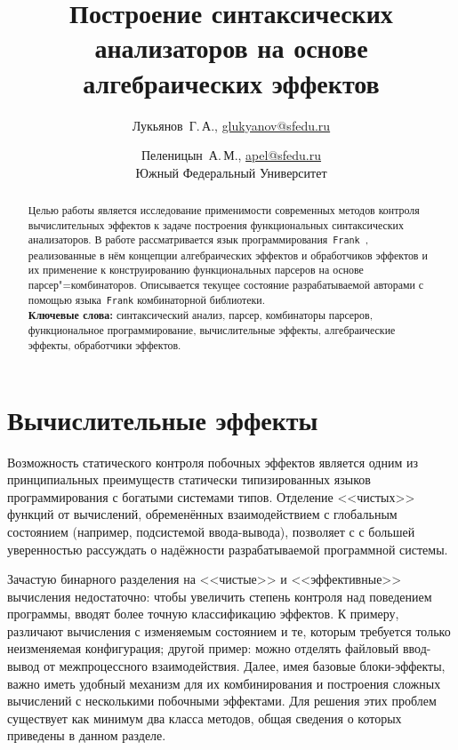 \documentclass [a4paper] {article}
\title %
  {Построение синтаксических анализаторов
   на основе алгебраических эффектов}
\author %
{%
  Лукьянов~Г.\,А., \url {glukyanov@sfedu.ru} \and %
  Пеленицын~А.\,М., \url {apel@sfedu.ru} \\
  Южный Федеральный Университет
}%
\date {}    %
\begin{document}

\maketitle

\begin {abstract}
  Целью работы является исследование применимости современных методов
  контроля вычислительных эффектов к задаче построения функциональных синтаксических анализаторов. В работе рассматривается язык
  программирования~\texttt{Frank}~\cite{Frank}, реализованные в нём концепции
  алгебраических эффектов и обработчиков эффектов и их применение к конструированию функциональных парсеров на основе парсер"=комбинаторов. Описывается текущее состояние
  разрабатываемой авторами с помощью языка~\texttt{Frank} комбинаторной библиотеки.
  \\ \textbf {Ключевые слова:} синтаксический анализ, парсер,
  комбинаторы парсеров, функциональное программирование, вычислительные эффекты,
  алгебраические эффекты, обработчики эффектов.
\end {abstract}


\section{Вычислительные эффекты}

Возможность статического контроля побочных эффектов является одним из
принципиальных преимуществ статически типизированных языков
программирования с богатыми системами типов. Отделение <<чистых>> функций от вычислений, обременённых
взаимодействием с глобальным состоянием (например, подсистемой ввода-вывода), позволяет с с большей уверенностью рассуждать о надёжности
разрабатываемой программной системы.

Зачастую бинарного разделения на <<чистые>> и <<эффективные>>
вычисления недостаточно: чтобы увеличить степень контроля над поведением программы,
вводят более точную классификацию эффектов. К примеру, различают вычисления с изменяемым
состоянием и те, которым требуется только неизменяемая конфигурация;
другой пример: можно отделять файловый ввод-вывод от межпроцессного взаимодействия. Далее, имея
базовые блоки-эффекты, важно иметь удобный механизм для их комбинирования и
построения сложных вычислений с несколькими побочными эффектами. Для решения
этих проблем существует как минимум два класса методов, общая сведения о которых приведены в данном разделе.
\end{document}
